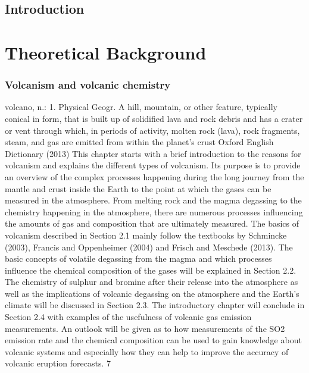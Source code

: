 \documentclass  [
  paper    = a4,
  BCOR     = 10mm,
  twoside,
  fontsize = 12pt,
  fleqn,
  toc      = bibnumbered,
  toc      = listofnumbered,
  numbers  = noendperiod,
  headings = normal,
  listof   = leveldown,
  version  = 3.03
]                                       {scrreprt}
\begin{document}
  

  \tableofcontents
	\chapter{Introduction}	
	
	\part{Theoretical Background}
	\section{Volcanism and volcanic chemistry}

	volcano, n.: 1. Physical Geogr. A hill, mountain, or other feature, typically
	conical in form, that is built up of solidified lava and rock debris and has a crater
	or vent through which, in periods of activity, molten rock (lava), rock fragments,
	steam, and gas are emitted from within the planet’s crust
	Oxford English Dictionary (2013)
	This chapter starts with a brief introduction to the reasons for volcanism and
	explains the different types of volcanism. Its purpose is to provide an overview
	of the complex processes happening during the long journey from the mantle
	and crust inside the Earth to the point at which the gases can be measured in
	the atmosphere.
	From melting rock and the magma degassing to the chemistry happening in
	the atmosphere, there are numerous processes influencing the amounts of gas and
	composition that are ultimately measured. The basics of volcanism described
	in Section 2.1 mainly follow the textbooks by Schmincke (2003), Francis and
	Oppenheimer (2004) and Frisch and Meschede (2013). The basic concepts of
	volatile degassing from the magma and which processes influence the chemical
	composition of the gases will be explained in Section 2.2. The chemistry of
	sulphur and bromine after their release into the atmosphere as well as the
	implications of volcanic degassing on the atmosphere and the Earth’s climate will
	be discussed in Section 2.3. The introductory chapter will conclude in Section 2.4
	with examples of the usefulness of volcanic gas emission measurements. An
	outlook will be given as to how measurements of the SO2 emission rate and the
	chemical composition can be used to gain knowledge about volcanic systems
	and especially how they can help to improve the accuracy of volcanic eruption
	forecasts.
	7
\end{document}
